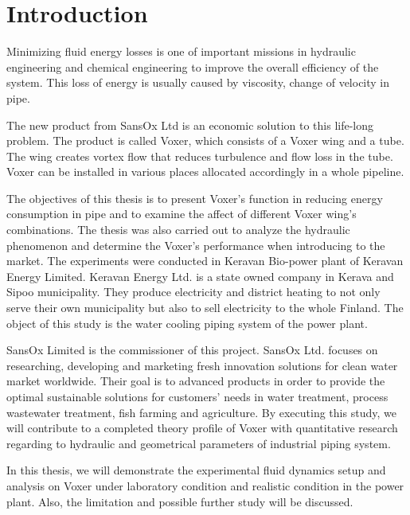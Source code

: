 
\chapter{Introduction}

Minimizing fluid energy losses is one of important missions in hydraulic engineering and chemical engineering to improve the overall efficiency of the system. This loss of energy is usually caused by viscosity, change of velocity in pipe.

The new product from SansOx Ltd is an economic solution to this life-long problem. The product is called Voxer, which consists of a Voxer wing and a tube. The wing creates vortex flow that reduces turbulence and flow loss in the tube. Voxer can be installed in various places allocated accordingly in a whole pipeline. 

The objectives of this thesis is to present Voxer's function in reducing energy consumption in pipe and to examine the affect of different Voxer wing's combinations. The thesis was also carried out to analyze the hydraulic phenomenon and determine the Voxer's performance when introducing to the market. \newline
The experiments were conducted in Keravan Bio-power plant of Keravan Energy Limited. Keravan Energy Ltd. is a state owned company in Kerava and Sipoo municipality. They produce electricity and district heating to not only serve their own municipality but also to sell electricity to the whole Finland. The object of this study is the water cooling piping system of the power plant.

SansOx Limited is the commissioner of this project. SansOx Ltd. focuses on researching, developing and marketing fresh innovation solutions for clean water market worldwide. Their goal is to advanced products in order to provide the optimal sustainable solutions for customers' needs in water treatment, process wastewater treatment, fish farming and agriculture. By executing this study, we will contribute to a completed theory profile of Voxer with quantitative research regarding to hydraulic and geometrical parameters of industrial piping system. 

In this thesis, we will demonstrate the experimental fluid dynamics setup and analysis on Voxer under laboratory condition and realistic condition in the power plant. Also, the limitation and possible further study will be discussed. 

\clearpage %
